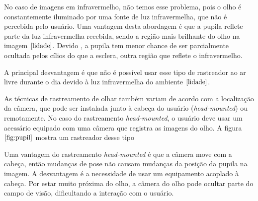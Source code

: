 No caso de imagens em infravermelho, não temos esse problema, pois o olho é constantemente iluminado por uma fonte de luz infravermelha, que não é percebida pelo usuário. Uma vantagem desta abordagem é que a pupila reflete  parte da luz infravermelha recebida, sendo a região mais brilhante do olho na imagem $\cite{lidade}$. Devido  , a pupila tem menor chance de ser parcialmente ocultada pelos  cílios do que a esclera, outra região que reflete o infravermelho. %

A principal desvantagem é que não é possível usar esse tipo de rastreador ao ar livre durante o dia devido à luz infravermelha do ambiente $\cite{lidade}$.

As técnicas de rastreamento de olhar também variam de acordo com a localização da câmera, que pode ser instalada junto à cabeça do usuário (\textit{head-mounted}) ou remotamente. No caso do rastreamento \textit{head-mounted}, o usuário deve usar um acessário equipado com uma câmera que registra as imagens do olho. A figura $\ref{fig:pupil}$ mostra um rastreador desse tipo


Uma vantagem do rastreamento \textit{head-mounted} é que a câmera  move com a cabeça, então mudanças de pose não causam mudanças da posição da pupila na imagem. A desvantagem é a necessidade de usar um equipamento acoplado à cabeça. Por estar muito próxima do olho, a câmera do olho pode ocultar parte do campo de visão, dificultando a interação com o usuário.

